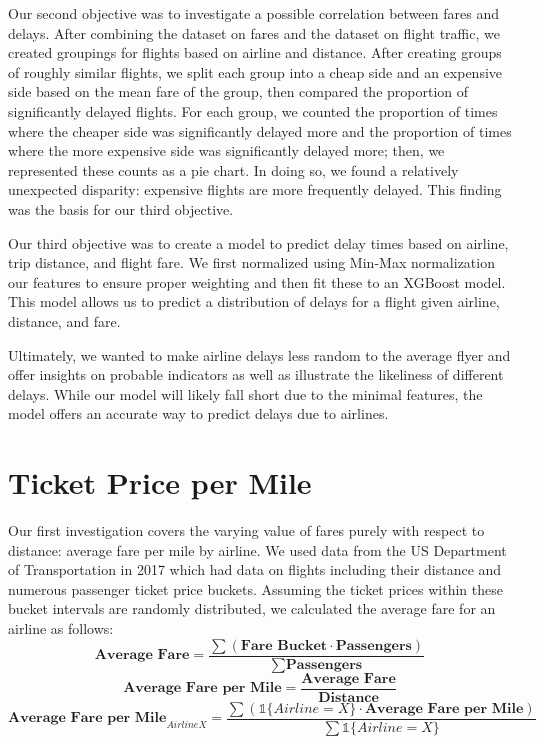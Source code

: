 \documentclass{article}
\begin{document}
Our second objective was to investigate a possible correlation between fares and delays. After combining the dataset on fares and the dataset on flight traffic, we created groupings for flights based on airline and distance. After creating groups of roughly similar flights, we split each group into a cheap side and an expensive side based on the mean fare of the group, then compared the proportion of significantly delayed flights. For each group, we counted the proportion of times where the cheaper side was significantly delayed more and the proportion of times where the more expensive side was significantly delayed more; then, we represented these counts as a pie chart. In doing so, we found a relatively unexpected disparity: expensive flights are more frequently delayed. This finding was the basis for our third objective.

Our third objective was to create a model to predict delay times based on airline, trip distance, and flight fare. We first normalized using Min-Max normalization our features to ensure proper weighting and then fit these to an XGBoost model. This model allows us to predict a distribution of delays for a flight given airline, distance, and fare. 

Ultimately, we wanted to make airline delays less random to the average flyer and offer insights on probable indicators as well as illustrate the likeliness of different delays. While our model will likely fall short due to the minimal features, the model offers an accurate way to predict delays due to airlines.


\section{Ticket Price per Mile}
Our first investigation covers the varying value of fares purely with respect to distance: average fare per mile by airline. We used data from the US Department of Transportation in 2017 which had data on flights including their distance and numerous passenger ticket price buckets. Assuming the ticket prices within these bucket intervals are randomly distributed, we calculated the average fare for an airline as follows:
$$\textbf{Average Fare} = \frac{\sum (\textbf{Fare Bucket} \cdot \textbf{Passengers})}{\sum \textbf{Passengers}} $$
$$\textbf{Average Fare per Mile} = \frac{\textbf{Average Fare}}{\textbf{Distance}} $$
$$ \textbf{Average Fare per Mile}_{Airline X} = \frac{\sum (\mathds{1}\{Airline=X\} \cdot \textbf{Average Fare per Mile})}{\sum  \mathds{1}\{Airline=X\}} $$
\end{document}
